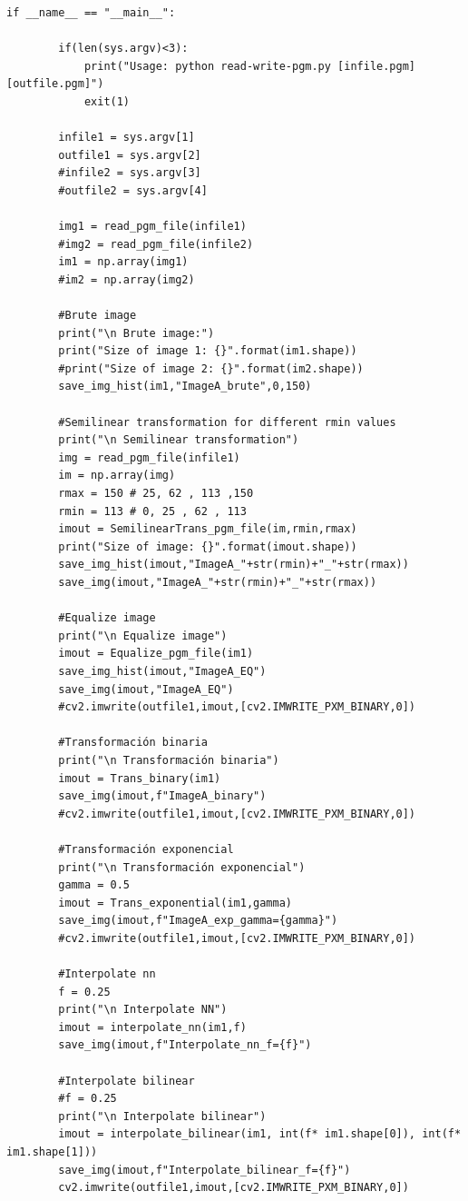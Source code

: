 \documentclass[11pt,twocolumn,twoside]{opticajnl}
\begin{document}
\begin{onecolumn}
\begin{lstlisting}[style=mystyle]
    if __name__ == "__main__":
        
        if(len(sys.argv)<3):
            print("Usage: python read-write-pgm.py [infile.pgm] [outfile.pgm]")
            exit(1)
    
        infile1 = sys.argv[1]
        outfile1 = sys.argv[2]
        #infile2 = sys.argv[3]
        #outfile2 = sys.argv[4]
        
        img1 = read_pgm_file(infile1)
        #img2 = read_pgm_file(infile2)
        im1 = np.array(img1)
        #im2 = np.array(img2)
        
        #Brute image 
        print("\n Brute image:")
        print("Size of image 1: {}".format(im1.shape))
        #print("Size of image 2: {}".format(im2.shape))
        save_img_hist(im1,"ImageA_brute",0,150)
    
        #Semilinear transformation for different rmin values
        print("\n Semilinear transformation")
        img = read_pgm_file(infile1)
        im = np.array(img)
        rmax = 150 # 25, 62 , 113 ,150
        rmin = 113 # 0, 25 , 62 , 113 
        imout = SemilinearTrans_pgm_file(im,rmin,rmax)
        print("Size of image: {}".format(imout.shape))
        save_img_hist(imout,"ImageA_"+str(rmin)+"_"+str(rmax))
        save_img(imout,"ImageA_"+str(rmin)+"_"+str(rmax))
    
        #Equalize image
        print("\n Equalize image")
        imout = Equalize_pgm_file(im1)
        save_img_hist(imout,"ImageA_EQ")    
        save_img(imout,"ImageA_EQ")    
        #cv2.imwrite(outfile1,imout,[cv2.IMWRITE_PXM_BINARY,0])
    
        #Transformación binaria
        print("\n Transformación binaria")
        imout = Trans_binary(im1)
        save_img(imout,f"ImageA_binary")
        #cv2.imwrite(outfile1,imout,[cv2.IMWRITE_PXM_BINARY,0])
    
        #Transformación exponencial
        print("\n Transformación exponencial")
        gamma = 0.5
        imout = Trans_exponential(im1,gamma)
        save_img(imout,f"ImageA_exp_gamma={gamma}")
        #cv2.imwrite(outfile1,imout,[cv2.IMWRITE_PXM_BINARY,0])
        
        #Interpolate nn
        f = 0.25
        print("\n Interpolate NN")
        imout = interpolate_nn(im1,f)
        save_img(imout,f"Interpolate_nn_f={f}")
    
        #Interpolate bilinear
        #f = 0.25
        print("\n Interpolate bilinear")
        imout = interpolate_bilinear(im1, int(f* im1.shape[0]), int(f* im1.shape[1]))
        save_img(imout,f"Interpolate_bilinear_f={f}")
        cv2.imwrite(outfile1,imout,[cv2.IMWRITE_PXM_BINARY,0])
    

\end{lstlisting}
\end{onecolumn}
\end{document}
